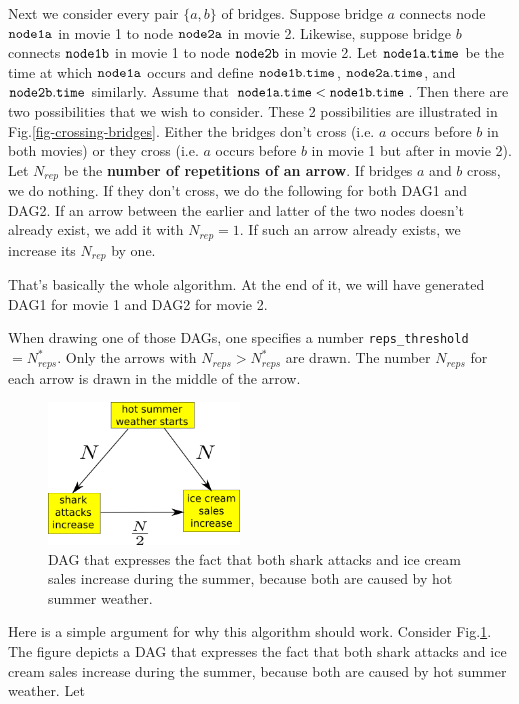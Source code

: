 \documentclass[12pt]{article}
\begin{document}
Next we consider every  pair $\{a,b\}$
of bridges. Suppose bridge  $a$ 
connects node $\tt node1a$ in movie 1
to node $\tt node2a$ in movie 2.
Likewise, suppose bridge $b$ connects
$\tt node1b$ in movie 1 to
node $\tt node2b$ in movie 2.
Let $\tt node1a.time$ be the time at which 
$\tt node1a$ occurs and define
$\tt node1b.time$,
$\tt node2a.time$, and
$\tt node2b.time$ similarly.
Assume that
$\tt
node1a.time< node1b.time$.
Then there are two possibilities
that we wish to consider. These 2 possibilities are illustrated in Fig.\ref{fig-crossing-bridges}.
Either the bridges don't cross 
(i.e. $a$ occurs before $b$ in both movies)
or they cross (i.e. $a$ occurs before $b$
in movie 1 but after in movie 2).
Let $N_{rep}$ be the {\bf number
of repetitions of an arrow}.
If bridges $a$ and $b$ cross,
we do nothing. If they don't cross,
we do the following for both DAG1 and DAG2.
If an arrow between the earlier and latter of the two nodes doesn't already
exist, we add it with $N_{rep}=1$.
If such an arrow already exists,
we increase its $N_{rep}$ by one.

That's basically the whole algorithm.
At the end of it, we will have
generated DAG1 for movie 1 and DAG2 for movie 2.

When drawing one of those DAGs,
one specifies a number {\tt reps\_threshold}$=N_{reps}^*$.
Only the arrows with $N_{reps}> N^*_{reps}$
are drawn.
The number $N_{reps}$ for each arrow is drawn
in the middle of the arrow.




\begin{figure}[h!]
\centering
\includegraphics[width=2in]
{shark-attacks.png}
\caption{
DAG that expresses the fact that both
shark attacks and ice
cream sales increase during the summer,
because both are caused by hot summer weather.
}
\label{fig-shark-attacks}
\end{figure}

Here is a simple argument for
why this algorithm should work.
Consider Fig.\ref{fig-shark-attacks}.
The figure depicts a DAG that
expresses the fact that both
shark attacks and ice
cream sales increase during the summer,
because both are caused by hot summer weather.
Let 
\end{document}
